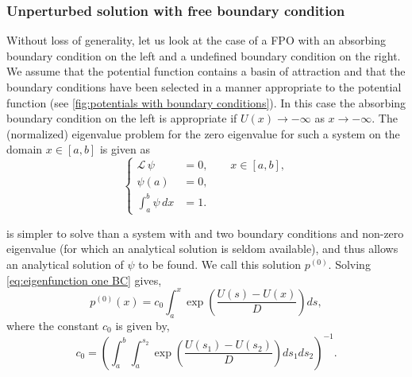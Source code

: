 \documentclass[11pt]{amsart}
\newcommand{\rev}[1]{\textcolor{red}{[#1]}}
\begin{document}
\subsubsection*{Unperturbed solution with free boundary condition}
Without loss of generality, let us look at the case of a FPO with an absorbing boundary condition on the left and a undefined boundary condition on the right. We assume that the potential function contains a basin of attraction and that the boundary conditions have been selected in a manner appropriate to the potential function (see \cref{fig:potentials with boundary conditions}). In this case the absorbing boundary condition on the left is appropriate if $U(x) \to -\infty$ as $x\to-\infty$. The (normalized) eigenvalue problem for the zero eigenvalue for such a system on the domain $x\in[a,b]$ is given as
\begin{equation}
\label{eq:eigenfunction one BC}
\left\{
\begin{aligned}
\mathcal{L}\, \psi &= 0 , \qquad x \in [a, b], \\
\psi(a) &= 0, \\
\int_a^b\psi \, dx &= 1.
\end{aligned}
\right.
\end{equation}



  is simpler to solve than a system with and two boundary conditions and non-zero eigenvalue (for which an analytical solution is seldom available), and thus allows an analytical solution of $\psi$ to be found. We call this solution $p^{(0)}$. Solving \cref{eq:eigenfunction one BC} gives,
\begin{equation}
    \label{eq:unperturbed BC method p0}
    p^{(0)}(x) = c_0\int_{a}^{x} \exp\left(\frac{U(s)-U(x)}{D}\right) ds,
\end{equation}
where the constant $c_0$ is given by,
\begin{equation*}
    c_0=\left(\int_{a}^{b}\int_{a}^{s_2} \exp\left(\frac{U(s_1)-U(s_2)}{D}\right)ds_1 ds_2\right)^{-1}.
\end{equation*}
\end{document}

